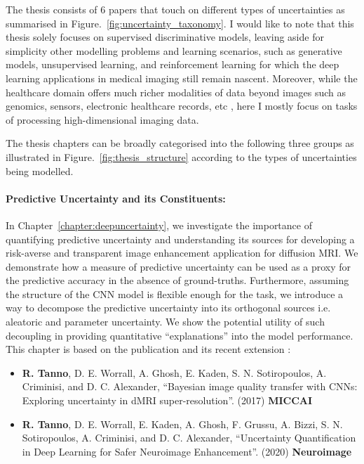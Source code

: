 The thesis consists of 6 papers that touch on different types of uncertainties as summarised in Figure.~\ref{fig:uncertainty_taxonomy}. I would like to note that this thesis solely focuses on supervised discriminative models, leaving aside for simplicity other modelling problems and learning scenarios, such as generative models, unsupervised learning, and reinforcement learning for which the deep learning applications in medical imaging still remain nascent. Moreover, while the healthcare domain offers much richer modalities of data beyond images such as genomics, sensors, electronic healthcare records, etc \cite{esteva2019guide}, here I mostly focus on tasks of processing high-dimensional imaging data. 

The thesis chapters can be broadly categorised into the following three groups as illustrated in Figure.~\ref{fig:thesis_structure} according to the types of uncertainties being modelled. 


\paragraph{Predictive Uncertainty and its Constituents:} In Chapter~\ref{chapter:deepuncertainty}, we investigate the importance of quantifying predictive uncertainty and understanding its sources for developing a risk-averse and transparent image enhancement application for diffusion MRI. We demonstrate how a measure of predictive uncertainty can be used as a proxy for the predictive accuracy in the absence of ground-truths. Furthermore, assuming the structure of the CNN model is flexible enough for the task, we introduce a way to decompose the predictive uncertainty into its orthogonal sources i.e. aleatoric and parameter uncertainty. We show the potential utility of such decoupling in providing quantitative ``explanations'' into the model performance. This chapter is based on the publication  \cite{tanno2017bayesian} and its recent extension \cite{tannonimg2019}:
\begin{itemize}
	\footnotesize
	\item \textbf{R. Tanno}, D. E. Worrall, A. Ghosh, E. Kaden, S. N. Sotiropoulos, A. Criminisi, and D. C. Alexander, “Bayesian image quality transfer with CNNs: Exploring uncertainty in dMRI super-resolution”. (2017) \textbf{MICCAI}
	\item \textbf{R. Tanno}, D. E. Worrall, E. Kaden, A. Ghosh, F. Grussu, A. Bizzi, S. N. Sotiropoulos, A. Criminisi, and D. C. Alexander, ``Uncertainty Quantification in Deep Learning for Safer Neuroimage Enhancement''. (2020) \textbf{Neuroimage} 
\end{itemize}
	
